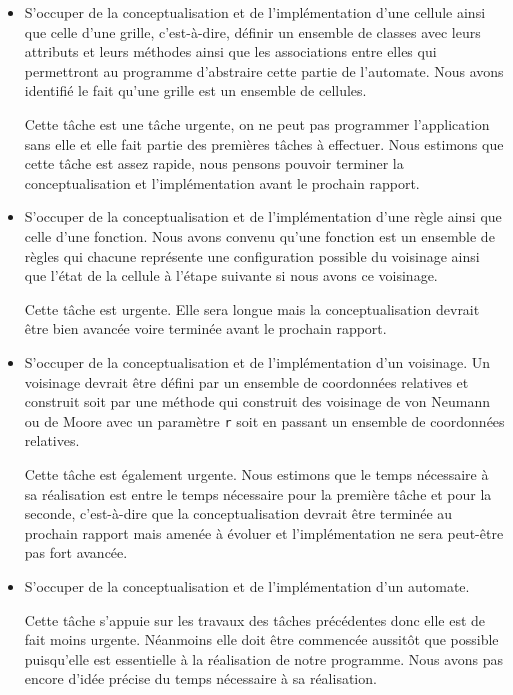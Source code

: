 \documentclass[11pt]{article}
\begin{document}
\begin{itemize}
    \item S'occuper de la conceptualisation et de l'implémentation d'une cellule ainsi que celle d'une grille, c'est-à-dire, définir un ensemble de classes avec leurs attributs et leurs méthodes ainsi que les associations entre elles qui permettront au programme d'abstraire cette partie de l'automate. Nous avons identifié le fait qu'une grille est un ensemble de cellules.
    
    Cette tâche est une tâche urgente, on ne peut pas programmer l'application sans elle et elle fait partie des premières tâches à effectuer. Nous estimons que cette tâche est assez rapide, nous pensons pouvoir terminer la conceptualisation et l'implémentation avant le prochain rapport.
    
    \item S'occuper de la conceptualisation et de l'implémentation d'une règle ainsi que celle d'une fonction. Nous avons convenu qu'une fonction est un ensemble de règles qui chacune représente une configuration possible du voisinage ainsi que l'état de la cellule à l'étape suivante si nous avons ce voisinage.
    
    Cette tâche est urgente. Elle sera longue mais la conceptualisation devrait être bien avancée voire terminée avant le prochain rapport.
    
    \item S'occuper de la conceptualisation et de l'implémentation d'un voisinage. Un voisinage devrait être défini par un ensemble de coordonnées relatives et construit soit par une méthode qui construit des voisinage de von Neumann ou de Moore avec un paramètre \texttt{r} soit en passant un ensemble de coordonnées relatives.
    
    Cette tâche est également urgente. Nous estimons que le temps nécessaire à sa réalisation est entre le temps nécessaire pour la première tâche et pour la seconde, c'est-à-dire que la conceptualisation devrait être terminée au prochain rapport mais amenée à évoluer et l'implémentation ne sera peut-être pas fort avancée.
    
    \item S'occuper de la conceptualisation et de l'implémentation d'un automate.
    
    Cette tâche s'appuie sur les travaux des tâches précédentes donc elle est de fait moins urgente. Néanmoins elle doit être commencée aussitôt que possible puisqu'elle est essentielle à la réalisation de notre programme. Nous avons pas encore d'idée précise du temps nécessaire à sa réalisation.
    

\end{itemize}
\end{document}
